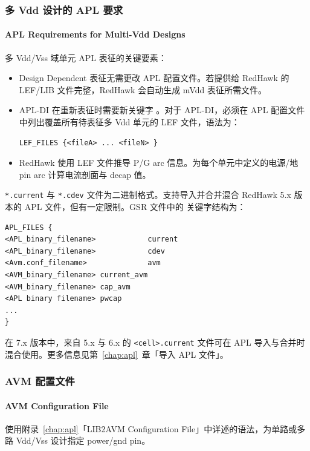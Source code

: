 \subsubsection{多 Vdd 设计的 APL 要求}
\paragraph*{APL Requirements for Multi-Vdd Designs}

多 Vdd/Vss 域单元 APL 表征的关键要素：
\begin{itemize}
  \item Design Dependent 表征无需更改 APL 配置文件。若提供给 RedHawk 的 LEF/LIB 文件完整，RedHawk 会自动生成 mVdd 表征所需文件。
  \item APL-DI 在重新表征时需要新关键字 。对于 APL-DI，必须在 APL 配置文件中列出覆盖所有待表征多 Vdd 单元的 LEF 文件，语法为：
\begin{lstlisting}
LEF_FILES {<fileA> ... <fileN> }
\end{lstlisting}
  \item RedHawk 使用 LEF 文件推导 P/G arc 信息。为每个单元中定义的电源/地 pin arc 计算电流剖面与 decap 值。
\end{itemize}

\begin{noteBox}
\texttt{*.current} 与 \texttt{*.cdev} 文件为二进制格式。支持导入并合并混合 RedHawk 5.x 版本的 APL 文件，但有一定限制。GSR 文件中的  关键字结构为：
\begin{lstlisting}
APL_FILES {
<APL_binary_filename>            current
<APL_binary_filename>            cdev
<Avm.conf_filename>              avm
<AVM_binary_filename> current_avm
<AVM_binary_filename> cap_avm
<APL binary filename> pwcap
...
}
\end{lstlisting}
在 7.x 版本中，来自 5.x 与 6.x 的 \texttt{<cell>.current} 文件可在 APL 导入与合并时混合使用。更多信息见第~\ref{chap:apl}~章「导入 APL 文件」。
\end{noteBox}

\subsubsection{AVM 配置文件}
\paragraph*{AVM Configuration File}

使用附录~\ref{chap:apl}「LIB2AVM Configuration File」中详述的语法，为单路或多路 Vdd/Vss 设计指定 power/gnd pin。

